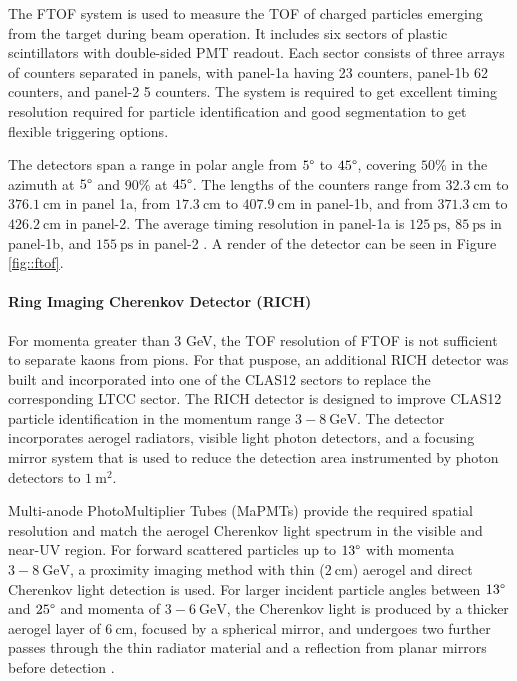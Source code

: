     The FTOF system is used to measure the TOF of charged particles emerging from the target during beam operation.
    It includes six sectors of plastic scintillators with double-sided PMT readout.
    Each sector consists of three arrays of counters separated in panels, with panel-1a having 23 counters, panel-1b 62 counters, and panel-2 5 counters.
    The system is required to get excellent timing resolution required for particle identification and good segmentation to get flexible triggering options.

    The detectors span a range in polar angle from $5\degree$ to $45\degree$, covering $50\%$ in the azimuth at $5\degree$ and $90\%$ at $45\degree$.
    The lengths of the counters range from $32.3 ~\text{cm}$ to $376.1 ~\text{cm}$ in panel 1a, from $17.3 ~\text{cm}$ to $407.9 ~\text{cm}$ in panel-1b, and from $371.3 ~\text{cm}$ to $426.2 ~\text{cm}$ in panel-2.
    The average timing resolution in panel-1a is $125 ~\text{ps}$, $85 ~\text{ps}$ in panel-1b, and $155 ~\text{ps}$ in panel-2 \cite{carman2020ftof}.
    A render of the detector can be seen in Figure \ref{fig::ftof}.

\paragraph{Ring Imaging Cherenkov Detector (RICH)}
    For momenta greater than 3 GeV, the TOF resolution of FTOF is not sufficient to separate kaons from pions.
    For that puspose, an additional RICH detector was built and incorporated into one of the CLAS12 sectors to replace the corresponding LTCC sector.
    The RICH detector is designed to improve CLAS12 particle identification in the momentum range $3 - 8 ~\text{GeV}$.
    The detector incorporates aerogel radiators, visible light photon detectors, and a focusing mirror system that is used to reduce the detection area instrumented by photon detectors to $1 ~\text{m}^2$.

    Multi-anode PhotoMultiplier Tubes (MaPMTs) provide the required spatial resolution and match the aerogel Cherenkov light spectrum in the visible and near-UV region.
    For forward scattered particles up to $13\degree$ with momenta $3 - 8 ~\text{GeV}$, a proximity imaging method with thin ($2 ~\text{cm}$) aerogel and direct Cherenkov light detection is used.
    For larger incident particle angles between $13\degree$ and $25\degree$ and momenta of $3 - 6 ~\text{GeV}$, the Cherenkov light is produced by a thicker aerogel layer of $6 ~\text{cm}$, focused by a spherical mirror, and undergoes two further passes through the thin radiator material and a reflection from planar mirrors before detection \cite{contalbrigo2020}.

